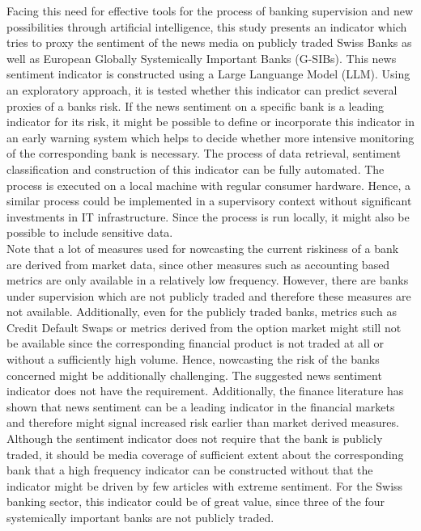 Facing this need for effective tools for the process of banking supervision and new possibilities through artificial intelligence, this study presents an indicator which tries to proxy the sentiment of the news media on publicly traded Swiss Banks as well as European Globally Systemically Important Banks (G-SIBs). This news sentiment indicator is constructed using a Large Languange Model (LLM). Using an exploratory approach, it is tested whether this indicator can predict several proxies of a banks risk. If the news sentiment on a specific bank is a leading indicator for its risk, it might be possible to define or incorporate this indicator in an early warning system which helps to decide whether more intensive monitoring of the corresponding bank is necessary. The process of data retrieval, sentiment classification and construction of this indicator can be fully automated. The process is executed on a local machine with regular consumer hardware. Hence, a similar process could be implemented in a supervisory context without significant investments in IT infrastructure. Since the process is run locally, it might also be possible to include sensitive data. \\

Note that a lot of measures used for nowcasting the current riskiness of a bank are derived from market data, since other measures such as accounting based metrics are only available in a relatively low frequency. However, there are banks under supervision which are not publicly traded and therefore these measures are not available. Additionally, even for the publicly traded banks, metrics such as Credit Default Swaps or metrics derived from the option market might still not be available since the corresponding financial product is not traded at all or without a sufficiently high volume. Hence, nowcasting the risk of the banks concerned might be additionally challenging. The suggested news sentiment indicator does not have the requirement. Additionally, the finance literature has shown that news sentiment can be a leading indicator in the financial markets and therefore might signal increased risk earlier than market derived measures. Although the sentiment indicator does not require that the bank is publicly traded, it should be media coverage of sufficient extent about the corresponding bank that a high frequency indicator can be constructed without that the indicator might be driven by few articles with extreme sentiment. For the Swiss banking sector, this indicator could be of great value, since three of the four systemically important banks are not publicly traded.



\cleardoublepage
